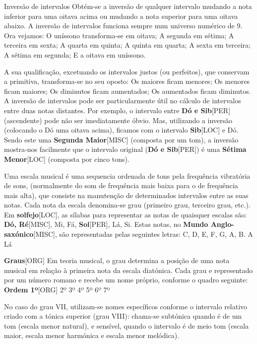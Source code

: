 \documentclass[a4paper,12pt]{article}
\begin{document}
Inversão de intervalos Obtém-se a inversão de qualquer intervalo mudando a nota inferior para uma oitava acima ou mudando a nota superior para uma oitava abaixo. A inversão de intervalos funciona sempre num universo numérico de 9. Ora vejamos: O uníssono transforma-se em oitava; A segunda em sétima; A terceira em sexta; A quarta em quinta; A quinta em quarta; A sexta em terceira; A sétima em segunda; E a oitava em uníssono.

A sua qualificação, excetuando os intervalos justos (ou perfeitos), que conservam a primitiva, transforma-se no seu oposto: Os maiores ficam menores; Os menores ficam maiores; Os diminutos ficam aumentados; Os aumentados ficam diminutos. A inversão de intervalos pode ser particularmente útil no cálculo de intervalos entre duas notas distantes. Por exemplo, o intervalo entre \textbf{Dó e Sib}\textsc{[PER]} (ascendente) pode não ser imediatamente óbvio. Mas, utilizando a inversão (colocando o Dó uma oitava acima), ficamos com o intervalo \textbf{Sib}\textsc{[LOC]} e Dó. Sendo este uma \textbf{Segunda Maior}\textsc{[MISC]} (composta por um tom), a inversão mostra-nos facilmente que o intervalo original (\textbf{Dó e Sib}\textsc{[PER]}) é uma \textbf{Sétima Menor}\textsc{[LOC]} (composta por cinco tons).

Uma escala musical é uma sequencia ordenada de tons pela frequência vibratória de sons, (normalmente do som de frequência mais baixa para o de frequência mais alta), que consiste na manutenção de determinados intervalos entre as suas notas. Cada nota da escala denomina-se grau (primeiro grau, terceiro grau, etc.). Em \textbf{solfejo}\textsc{[LOC]}, as sílabas para representar as notas de quaisquer escalas são: \textbf{Dó, Ré}\textsc{[MISC]}, Mi, Fá, \textbf{Sol}\textsc{[PER]}, Lá, Si. Estas notas, no \textbf{Mundo Anglo-saxónico}\textsc{[MISC]}, são representadas pelas seguintes letras: C, D, E, F, G, A, B. A Lá

\textbf{Graus}\textsc{[ORG]} Em teoria musical, o grau determina a posição de uma nota musical em relação à primeira nota da escala diatónica. Cada grau e representado por um número romano e recebe um nome próprio, conforme o quadro seguinte: \textbf{Ordem 1º}\textsc{[ORG]} 2º 3º 4º 5º 6º 7º

No caso do grau VII, utilizam-se nomes específicos conforme o intervalo relativo criado com a tónica superior (grau VIII): chama-se subtónica quando é de um tom (escala menor natural), e sensível, quando o intervalo é de meio tom (escala maior, escala menor harmónica e escala menor melódica).
\end{document}
